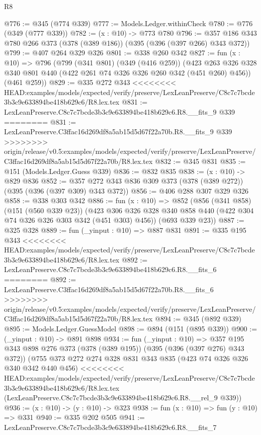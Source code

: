 \begin{lexlean}{R8}
\begin{coremodule}
{{{{{{{{{{{{{{{{{{{{{{{@776 := @345 (@774 @339)
@777 := Models.Ledger.withinCheck
@780 := @776 (@349 (@777 @339))
@782 := (x : @10) -> @773 @780
@796 := @357 @186 @343 @780 @266 @373 (@378 (@389 @186)) (@395 (@396 (@397 @266) @343 @372))
@799 := @407 @264 @329 @326
@801 := @338 @260 @342
@827 := fun (x : @10) =>
  @796
    (@799
      (@341 @801)
      (@349 (@416 @259))
      (@423 @263 @326 @328 @340 @801 @440 (@422 @261 @74 @326 @326 @260 @342 (@451 @260) @456))
      (@461 @259))
@829 := @335 @272 @343
<<<<<<<< HEAD:examples/models/expected/verify/preserve/LexLeanPreserve/C8c7c7bcde3b3c9e633894be418b629c6/R8.lex.tex
@831 := LexLeanPreserve.C8c7c7bcde3b3c9e633894be418b629c6.R8.__fits_9 @339
========
@831 := LexLeanPreserve.C3ffac16d269df8a5ab15d5d67f22a70b.R8.__fits_9 @339
>>>>>>>> origin/release/v0.5:examples/models/expected/verify/preserve/LexLeanPreserve/C3ffac16d269df8a5ab15d5d67f22a70b/R8.lex.tex
@832 := @345 @831
@835 := @151 (Models.Ledger.Guess @339)
@836 := @832 @835
@838 := (x : @10) -> @829 @836
@852 := @357 @272 @343 @836 @309 @373 (@378 (@389 @272)) (@395 (@396 (@397 @309) @343 @372))
@856 := @406 @288 @307 @329 @326
@858 := @338 @303 @342
@886 := fun (x : @10) =>
  @852
    (@856
      (@341 @858)
      (@151 (@560 @339 @23))
      (@423 @306 @326 @328 @340 @858 @440 (@422 @304 @74 @326 @326 @303 @342 (@451 @303) @456))
      (@693 @339 @23))
@887 := @325 @328
@889 := fun (_yinput : @10) => @887 @831
@891 := @335 @195 @343
<<<<<<<< HEAD:examples/models/expected/verify/preserve/LexLeanPreserve/C8c7c7bcde3b3c9e633894be418b629c6/R8.lex.tex
@892 := LexLeanPreserve.C8c7c7bcde3b3c9e633894be418b629c6.R8.__fits_6
========
@892 := LexLeanPreserve.C3ffac16d269df8a5ab15d5d67f22a70b.R8.__fits_6
>>>>>>>> origin/release/v0.5:examples/models/expected/verify/preserve/LexLeanPreserve/C3ffac16d269df8a5ab15d5d67f22a70b/R8.lex.tex
@894 := @345 (@892 @339)
@895 := Models.Ledger.GuessModel
@898 := @894 (@151 (@895 @339))
@900 := (_yinput : @10) -> @891 @898
@934 := fun (_yinput : @10) =>
  @357
    @195
    @343
    @898
    @276
    @373
    (@378 (@389 @195))
    (@395 (@396 (@397 @276) @343 @372))
    (@755
      @373
      @272
      @274
      @328
      @831
      @343
      @835
      (@423 @74 @326 @326 @340 @342 @440 @456)
<<<<<<<< HEAD:examples/models/expected/verify/preserve/LexLeanPreserve/C8c7c7bcde3b3c9e633894be418b629c6/R8.lex.tex
      (LexLeanPreserve.C8c7c7bcde3b3c9e633894be418b629c6.R8.__rel_9 @339))
@936 := (x : @10) -> (y : @10) -> @323
@938 := fun (x : @10) => fun (y : @10) => @331
@940 := @335 @202 @505
@941 := LexLeanPreserve.C8c7c7bcde3b3c9e633894be418b629c6.R8.__fits_7
}}}}}}}}}}}}}}}}}}}}}}}
\end{coremodule}
\end{lexlean}
